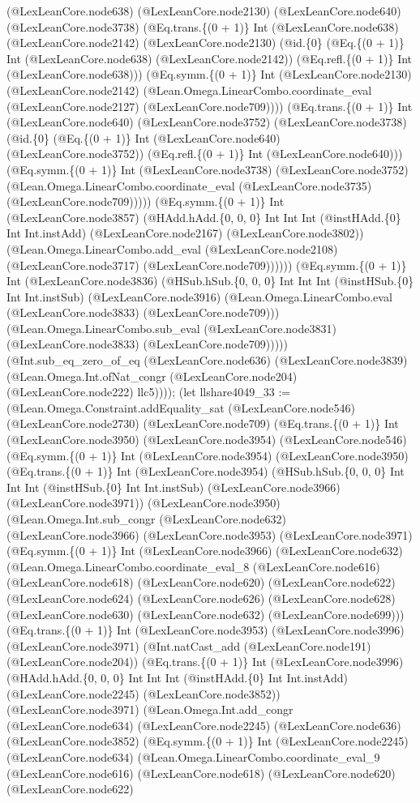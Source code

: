 \documentclass[11pt]{article}
\begin{document}
(@LexLeanCore.node638) (@LexLeanCore.node2130) (@LexLeanCore.node640) (@LexLeanCore.node3738) (@Eq.trans.\{(0 + 1)\} Int (@LexLeanCore.node638) (@LexLeanCore.node2142) (@LexLeanCore.node2130) (@id.\{0\} (@Eq.\{(0 + 1)\} Int (@LexLeanCore.node638) (@LexLeanCore.node2142)) (@Eq.refl.\{(0 + 1)\} Int (@LexLeanCore.node638))) (@Eq.symm.\{(0 + 1)\} Int (@LexLeanCore.node2130) (@LexLeanCore.node2142) (@Lean.Omega.LinearCombo.coordinate\_eval (@LexLeanCore.node2127) (@LexLeanCore.node709)))) (@Eq.trans.\{(0 + 1)\} Int (@LexLeanCore.node640) (@LexLeanCore.node3752) (@LexLeanCore.node3738) (@id.\{0\} (@Eq.\{(0 + 1)\} Int (@LexLeanCore.node640) (@LexLeanCore.node3752)) (@Eq.refl.\{(0 + 1)\} Int (@LexLeanCore.node640))) (@Eq.symm.\{(0 + 1)\} Int (@LexLeanCore.node3738) (@LexLeanCore.node3752) (@Lean.Omega.LinearCombo.coordinate\_eval (@LexLeanCore.node3735) (@LexLeanCore.node709))))) (@Eq.symm.\{(0 + 1)\} Int (@LexLeanCore.node3857) (@HAdd.hAdd.\{0, 0, 0\} Int Int Int (@instHAdd.\{0\} Int Int.instAdd) (@LexLeanCore.node2167) (@LexLeanCore.node3802)) (@Lean.Omega.LinearCombo.add\_eval (@LexLeanCore.node2108) (@LexLeanCore.node3717) (@LexLeanCore.node709)))))) (@Eq.symm.\{(0 + 1)\} Int (@LexLeanCore.node3836) (@HSub.hSub.\{0, 0, 0\} Int Int Int (@instHSub.\{0\} Int Int.instSub) (@LexLeanCore.node3916) (@Lean.Omega.LinearCombo.eval (@LexLeanCore.node3833) (@LexLeanCore.node709))) (@Lean.Omega.LinearCombo.sub\_eval (@LexLeanCore.node3831) (@LexLeanCore.node3833) (@LexLeanCore.node709))))) (@Int.sub\_eq\_zero\_of\_eq (@LexLeanCore.node636) (@LexLeanCore.node3839) (@Lean.Omega.Int.ofNat\_congr (@LexLeanCore.node204) (@LexLeanCore.node222) llc5)))); (let llshare4049\_33 := (@Lean.Omega.Constraint.addEquality\_sat (@LexLeanCore.node546) (@LexLeanCore.node2730) (@LexLeanCore.node709) (@Eq.trans.\{(0 + 1)\} Int (@LexLeanCore.node3950) (@LexLeanCore.node3954) (@LexLeanCore.node546) (@Eq.symm.\{(0 + 1)\} Int (@LexLeanCore.node3954) (@LexLeanCore.node3950) (@Eq.trans.\{(0 + 1)\} Int (@LexLeanCore.node3954) (@HSub.hSub.\{0, 0, 0\} Int Int Int (@instHSub.\{0\} Int Int.instSub) (@LexLeanCore.node3966) (@LexLeanCore.node3971)) (@LexLeanCore.node3950) (@Lean.Omega.Int.sub\_congr (@LexLeanCore.node632) (@LexLeanCore.node3966) (@LexLeanCore.node3953) (@LexLeanCore.node3971) (@Eq.symm.\{(0 + 1)\} Int (@LexLeanCore.node3966) (@LexLeanCore.node632) (@Lean.Omega.LinearCombo.coordinate\_eval\_8 (@LexLeanCore.node616) (@LexLeanCore.node618) (@LexLeanCore.node620) (@LexLeanCore.node622) (@LexLeanCore.node624) (@LexLeanCore.node626) (@LexLeanCore.node628) (@LexLeanCore.node630) (@LexLeanCore.node632) (@LexLeanCore.node699))) (@Eq.trans.\{(0 + 1)\} Int (@LexLeanCore.node3953) (@LexLeanCore.node3996) (@LexLeanCore.node3971) (@Int.natCast\_add (@LexLeanCore.node191) (@LexLeanCore.node204)) (@Eq.trans.\{(0 + 1)\} Int (@LexLeanCore.node3996) (@HAdd.hAdd.\{0, 0, 0\} Int Int Int (@instHAdd.\{0\} Int Int.instAdd) (@LexLeanCore.node2245) (@LexLeanCore.node3852)) (@LexLeanCore.node3971) (@Lean.Omega.Int.add\_congr (@LexLeanCore.node634) (@LexLeanCore.node2245) (@LexLeanCore.node636) (@LexLeanCore.node3852) (@Eq.symm.\{(0 + 1)\} Int (@LexLeanCore.node2245) (@LexLeanCore.node634) (@Lean.Omega.LinearCombo.coordinate\_eval\_9 (@LexLeanCore.node616) (@LexLeanCore.node618) (@LexLeanCore.node620) (@LexLeanCore.node622) 
\end{document}
